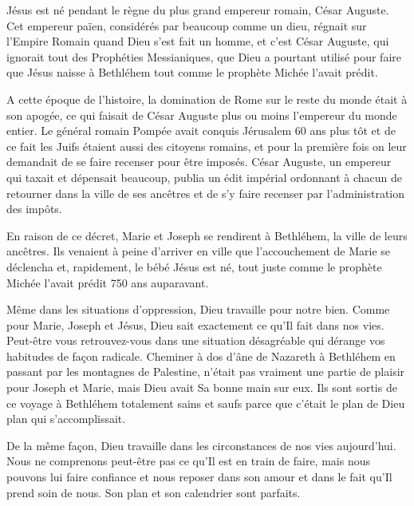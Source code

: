 

Jésus est né pendant le règne du plus grand empereur romain, César Auguste. Cet empereur païen, considérés par beaucoup comme un dieu, régnait sur l'Empire Romain quand Dieu s'est fait un homme, et c'est César Auguste, qui ignorait tout des Prophéties Messianiques, que Dieu a pourtant utilisé pour faire que Jésus naisse à Bethléhem tout comme le prophète Michée l'avait prédit.

A cette époque de l'histoire, la domination de Rome sur le reste du monde était à son apogée, ce qui faisait de César Auguste plus ou moins l'empereur du monde entier. Le général romain Pompée avait conquis Jérusalem 60 ans plus tôt et de ce fait les Juifs étaient aussi des citoyens romains, et pour la première fois on leur demandait de se faire recenser pour être imposés. César Auguste, un empereur qui taxait et dépensait beaucoup, publia un édit impérial ordonnant à chacun de retourner dans la ville de ses ancêtres et de s'y faire recenser par l'administration des impôts.

En raison de ce décret, Marie et Joseph se rendirent à Bethléhem, la ville de leurs ancêtres. Ils venaient à peine d'arriver en ville que l'accouchement de Marie se déclencha et, rapidement, le bébé Jésus est né, tout juste comme le prophète Michée l'avait prédit 750 ans auparavant.

Même dans les situations d'oppression, Dieu travaille pour notre bien. Comme pour Marie, Joseph et Jésus, Dieu sait exactement ce qu'Il fait dans nos vies. Peut-être vous retrouvez-vous dans une situation désagréable qui dérange vos habitudes de façon radicale. Cheminer à dos d'âne de Nazareth à Bethléhem en passant par les montagnes de Palestine, n'était pas vraiment une partie de plaisir pour Joseph et Marie, mais Dieu avait Sa bonne main sur eux. Ils sont sortis de ce voyage à Bethléhem totalement sains et saufs parce que c'était le plan de Dieu plan qui s'accomplissait.

De la même façon, Dieu travaille dans les circonstances de nos vies aujourd'hui. Nous ne comprenons peut-être pas ce qu'Il est en train de faire, mais nous pouvons lui faire confiance et nous reposer dans son amour et dans le fait qu'Il prend soin de nous. Son plan et son calendrier sont parfaits.


